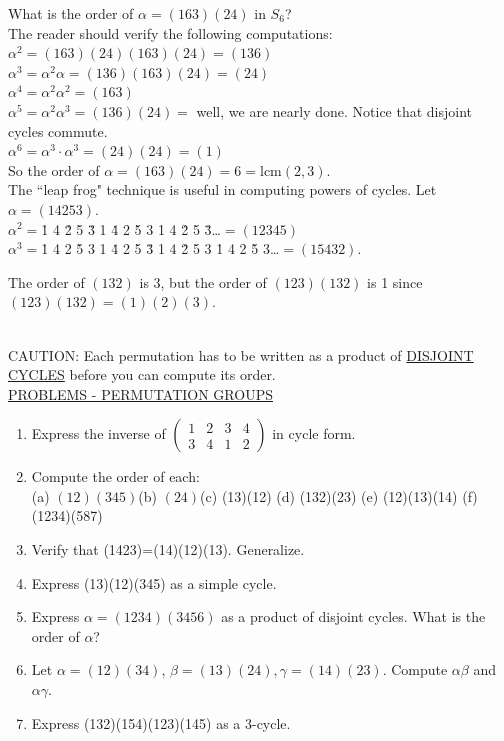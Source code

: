 \documentclass[12pt]{book}
\theoremstyle{definition}
\begin{document}
\begin{tcexample}{}{}
	What is the order of $ \alpha=(163)(24)$ in $ S_6 $?\\
	The reader should verify the following computations:\\
	$ \alpha^2=(163)(24)(163)(24)=(136) $\\
	$ \alpha^3=\alpha^2\alpha=(136)(163)(24)=(24) $\\
	$ \alpha^4=\alpha^2\alpha^2=(163) $\\
	$ \alpha^5=\alpha^2\alpha^3=(136)(24)= $ well, we are nearly done. Notice that disjoint cycles commute.\\
	$ \alpha^6=\alpha^3\cdot\alpha^3=(24)(24)=(1) $\\
	So the order of $ \alpha=(163)(24)=6=\text{lcm}(2,3) $.\\
	
	The ``leap frog" technique is useful in computing powers of cycles. Let $ \alpha=(14253) $.\\
	$ \alpha^2=$\.{1} 4 \.{2} 5 \.{3} 1 \.{4} 2 \.{5} 3 \.{1} 4 \.{2} 5 \.{3}\dots$ =(12345) $\\
	$ \alpha^3=$\.{1} 4 2 \.{5} 3 1 \.{4} 2 5 \.{3} 1 4 \.{2} 5 3 \.{1} 4 2 \.{5} 3\dots$ =(15432). $
\end{tcexample}

\begin{tcexample}{}{}
The order of $ (132) $ is 3, but the order of $ (123)(132) $ is 1 since $ (123)(132)=(1)(2)(3) $.
\end{tcexample}
~\\
CAUTION: Each permutation has to be written as a product of \underline{DISJOINT CYCLES} before you can compute its order.\\

\newpage  
\underline{PROBLEMS - PERMUTATION GROUPS}
\begin{enumerate}
	\item Express the inverse of $ \begin{pmatrix} 
	1 & 2 & 3 &  4\\
	3 & 4 & 1 & 2
	\end{pmatrix} $ in cycle form.
	\item Compute the order of each:\\
	(a) $ (12)(345) $\qquad (b) $ (24) $\qquad (c) (13)(12) \qquad (d) (132)(23) \qquad (e) (12)(13)(14) \qquad (f) (1234)(587)
	\item Verify that (1423)=(14)(12)(13). Generalize.
	\item Express (13)(12)(345) as a simple cycle.
	\item Express $ \alpha =(1234)(3456) $ as a product of disjoint cycles. What is the order of $ \alpha $?
	\item Let $ \alpha=(12)(34) $, $ \beta=(13)(24), \gamma=(14)(23) $. Compute $ \alpha\beta $ and $ \alpha\gamma $.
	\item Express (132)(154)(123)(145) as a 3-cycle.
\end{enumerate}  
\end{document}
